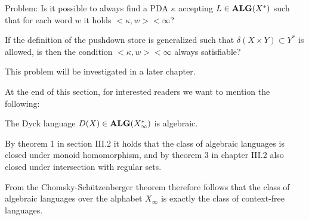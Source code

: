 Problem: Is it possible to always find a PDA $\kappa$ accepting 
$L \in \mbox{{\bf ALG}}(X^*)$ such that for each word $w$ it holds 
${<}\kappa, w{>} < \infty$?

If the definition of the pushdown store is generalized such that $\delta(X
\times Y) \subset Y^*$ is allowed, is then the condition ${<}\kappa, w{>} <
\infty$ always satisfiable?

This problem will be investigated in a later chapter.

\medskip
At the end of this section, for interested readers we want to mention the
following:

The Dyck language $D(X) \in \mbox{{\bf ALG}}(X_\infty^*)$ is algebraic.

By theorem 1 in section III.2 it holds that the class of algebraic languages is
closed under monoid homomorphism, and by theorem 3 in chapter III.2 also closed
under intersection with regular sets.

From the Chomsky-Schützenberger theorem therefore follows that the class of
algebraic languages over the alphabet $X_\infty$ is exactly the class of
context-free languages.
